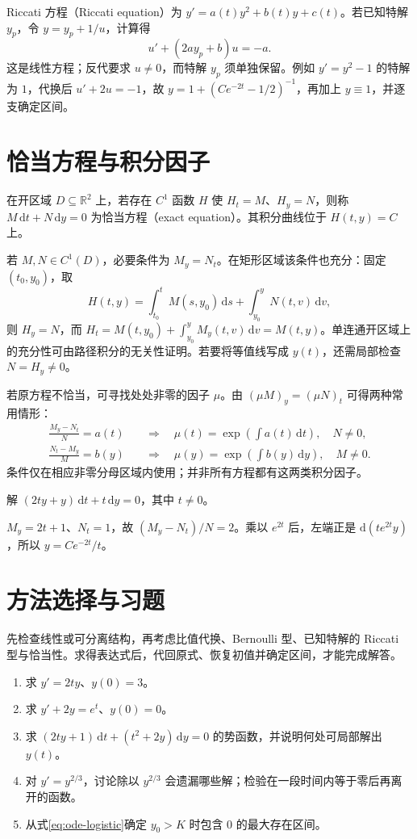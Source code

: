 Riccati 方程（Riccati equation）为 $y'=a(t)y^2+b(t)y+c(t)$。若已知特解 $y_p$，令 $y=y_p+1/u$，计算得
\[
 u'+(2ay_p+b)u=-a.
\]
这是线性方程；反代要求 $u\ne0$，而特解 $y_p$ 须单独保留。例如 $y'=y^2-1$ 的特解为 $1$，代换后 $u'+2u=-1$，故 $y=1+(Ce^{-2t}-1/2)^{-1}$，再加上 $y\equiv1$，并逐支确定区间。

\section{恰当方程与积分因子}
\begin{definition}
在开区域 $D\subseteq\mathbb R^2$ 上，若存在 $C^1$ 函数 $H$ 使 $H_t=M$、$H_y=N$，则称 $M\,\mathrm dt+N\,\mathrm dy=0$ 为恰当方程（exact equation）。其积分曲线位于 $H(t,y)=C$ 上。
\end{definition}

若 $M,N\in C^1(D)$，必要条件为 $M_y=N_t$。在矩形区域该条件也充分：固定 $(t_0,y_0)$，取
\[
 H(t,y)=\int_{t_0}^t M(s,y_0)\,\mathrm ds+\int_{y_0}^y N(t,v)\,\mathrm dv,
\]
则 $H_y=N$，而 $H_t=M(t,y_0)+\int_{y_0}^y M_y(t,v)\,\mathrm dv=M(t,y)$。单连通开区域上的充分性可由路径积分的无关性证明。若要将等值线写成 $y(t)$，还需局部检查 $N=H_y\ne0$。

若原方程不恰当，可寻找处处非零的因子 $\mu$。由 $(\mu M)_y=(\mu N)_t$ 可得两种常用情形：
\begin{align*}
 \frac{M_y-N_t}{N}=a(t)&\quad\Longrightarrow\quad \mu(t)=\exp\!\left(\int a(t)\,\mathrm dt\right),\quad N\ne0,\\
 \frac{N_t-M_y}{M}=b(y)&\quad\Longrightarrow\quad \mu(y)=\exp\!\left(\int b(y)\,\mathrm dy\right),\quad M\ne0.
\end{align*}
条件仅在相应非零分母区域内使用；并非所有方程都有这两类积分因子。

\begin{example}
解 $(2ty+y)\,\mathrm dt+t\,\mathrm dy=0$，其中 $t\ne0$。
\end{example}
\begin{solve}
$M_y=2t+1$、$N_t=1$，故 $(M_y-N_t)/N=2$。乘以 $e^{2t}$ 后，左端正是 $\mathrm d(te^{2t}y)$，所以 $y=Ce^{-2t}/t$。
\end{solve}

\section{方法选择与习题}
先检查线性或可分离结构，再考虑比值代换、Bernoulli 型、已知特解的 Riccati 型与恰当性。求得表达式后，代回原式、恢复初值并确定区间，才能完成解答。
\begin{enumerate}
 \item\label{ex:ode-separate} 求 $y'=2ty$、$y(0)=3$。
 \item\label{ex:ode-linear} 求 $y'+2y=e^t$、$y(0)=0$。
 \item\label{ex:ode-exact} 求 $(2ty+1)\,\mathrm dt+(t^2+2y)\,\mathrm dy=0$ 的势函数，并说明何处可局部解出 $y(t)$。
 \item 对 $y'=y^{2/3}$，讨论除以 $y^{2/3}$ 会遗漏哪些解；检验在一段时间内等于零后再离开的函数。
 \item 从式\eqref{eq:ode-logistic}确定 $y_0>K$ 时包含 $0$ 的最大存在区间。
\end{enumerate}

